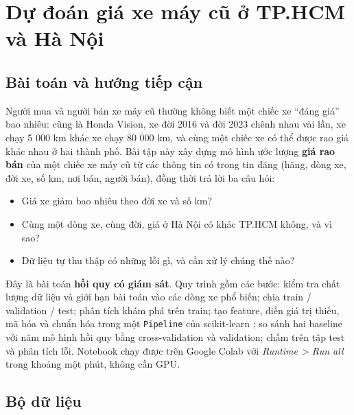\chapter[Dự đoán giá xe máy cũ]{Dự đoán giá xe máy cũ ở TP.HCM và Hà Nội}

\section{Bài toán và hướng tiếp cận}

Người mua và người bán xe máy cũ thường không biết một chiếc xe ``đáng giá'' bao nhiêu: cùng là Honda Vision, xe đời
2016 và đời 2023 chênh nhau vài lần, xe chạy 5 000 km khác xe chạy 80 000 km, và cùng một chiếc xe có thể được rao giá
khác nhau ở hai thành phố. Bài tập này xây dựng mô hình ước lượng \textbf{giá rao bán} của một chiếc xe máy cũ từ các
thông tin có trong tin đăng (hãng, dòng xe, đời xe, số km, nơi bán, người bán), đồng thời trả lời ba câu hỏi:

\begin{itemize}
  \item Giá xe giảm bao nhiêu theo đời xe và số km?
  \item Cùng một dòng xe, cùng đời, giá ở Hà Nội có khác TP.HCM không, và vì sao?
  \item Dữ liệu tự thu thập có những lỗi gì, và cần xử lý chúng thế nào?
\end{itemize}

Đây là bài toán \textbf{hồi quy có giám sát}. Quy trình gồm các bước: kiểm tra chất lượng dữ liệu và giới hạn bài toán
vào các dòng xe phổ biến; chia train / validation / test; phân tích khám phá trên train; tạo feature, điền giá trị
thiếu, mã hóa và chuẩn hóa trong một \texttt{Pipeline} của scikit-learn \cite{tab-sklearn}; so sánh hai baseline với năm
mô hình hồi quy bằng cross-validation và validation; chấm trên tập test và phân tích lỗi. Notebook chạy được trên Google
Colab với \textit{Runtime > Run all} trong khoảng một phút, không cần GPU.

\section{Bộ dữ liệu}


